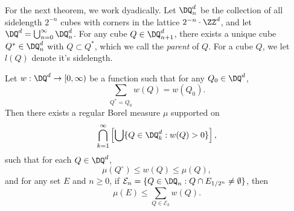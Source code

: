 For the next theorem, we work dyadically. Let $\DQ^d_n$ be the collection of all sidelength $2^{-n}$ cubes with corners in the lattice $2^{-n} \cdot \ZZ^d$, and let $\DQ^d = \bigcup_{n = 0}^\infty \DQ^d_n$. For any cube $Q \in \DQ^d_{n+1}$, there exists a unique cube $Q^* \in \DQ^d_n$ with $Q \subset Q^*$, which we call the \emph{parent} of $Q$. For a cube $Q$, we let $l(Q)$ denote it's sidelength.

\begin{theorem} \label{massdistributionprinciplelem}
	Let $w: \DQ^d \to [0,\infty)$ be a function such that for any $Q_0 \in \DQ^d$,
	\begin{equation} \label{equation73234091} \sum_{Q^* = Q_0} w(Q) = w(Q_0). \end{equation}
	Then there exists a regular Borel measure $\mu$ supported on
	\[ \bigcap_{k = 1}^\infty \left[ \bigcup \{ Q \in \DQ_k^d : w(Q) > 0 \} \right], \]
	such that for each $Q \in \DQ^d$,
	\begin{equation} \label{massdissupperbound} \mu(Q^\circ) \leq w(Q) \leq \mu(Q), \end{equation}
	and for any set $E$ and $n \geq 0$, if $\mathcal{E}_n = \{ Q \in \DQ_n : Q \cap E_{1/2^n} \neq \emptyset \}$, then
	\begin{equation} \label{massdisslowerbound} \mu(E) \leq \sum_{Q \in \mathcal{E}_k} w(Q). \end{equation}
\end{theorem}
